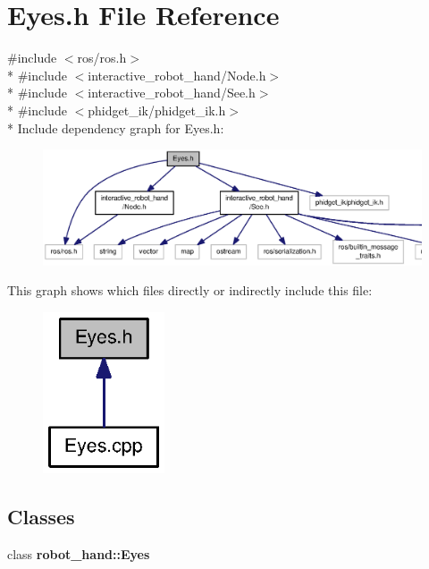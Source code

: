 \section{Eyes.\-h File Reference}
\label{Eyes_8h}
{\ttfamily \#include $<$ros/ros.\-h$>$}\\*
{\ttfamily \#include $<$interactive\-\_\-robot\-\_\-hand/\-Node.\-h$>$}\\*
{\ttfamily \#include $<$interactive\-\_\-robot\-\_\-hand/\-See.\-h$>$}\\*
{\ttfamily \#include $<$phidget\-\_\-ik/phidget\-\_\-ik.\-h$>$}\\*
Include dependency graph for Eyes.\-h\-:
\nopagebreak
\begin{figure}[H]
\begin{center}
\leavevmode
\includegraphics[width=350pt]{Eyes_8h__incl}
\end{center}
\end{figure}
This graph shows which files directly or indirectly include this file\-:
\nopagebreak
\begin{figure}[H]
\begin{center}
\leavevmode
\includegraphics[width=102pt]{Eyes_8h__dep__incl}
\end{center}
\end{figure}
\subsection*{Classes}
\begin{DoxyCompactItemize}
\item 
class {\bf robot\-\_\-hand\-::\-Eyes}
\end{DoxyCompactItemize}
